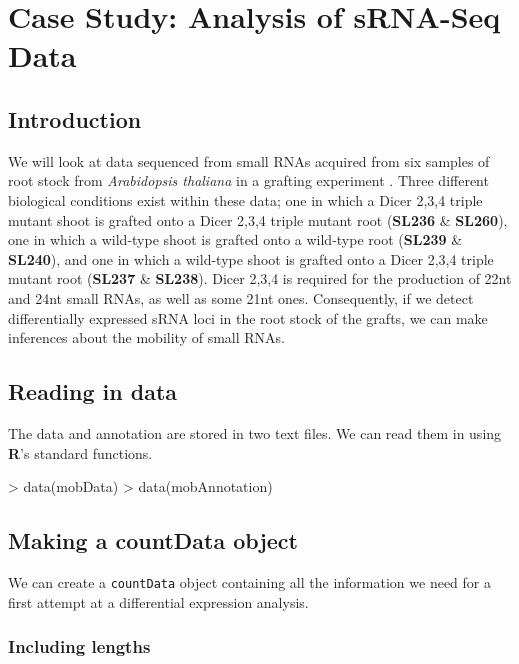\documentclass[a4paper]{article}
\begin{document}
\clearpage

\section{Case Study: Analysis of sRNA-Seq Data}

\subsection{Introduction}

We will look at data sequenced from small RNAs acquired from six samples of root stock from \textsl{Arabidopsis thaliana} in a grafting experiment \cite{molnar}. Three different biological conditions exist within these data; one in which a Dicer 2,3,4 triple mutant shoot is grafted onto a Dicer 2,3,4 triple mutant root (\textbf{SL236} \& \textbf{SL260}), one in which a wild-type shoot is grafted onto a wild-type root (\textbf{SL239} \& \textbf{SL240}), and one in which a wild-type shoot is grafted onto a Dicer 2,3,4 triple mutant root (\textbf{SL237} \& \textbf{SL238}). Dicer 2,3,4 is required for the production of 22nt and 24nt small RNAs, as well as some 21nt ones. Consequently, if we detect differentially expressed  sRNA loci in the root stock of the grafts, we can make inferences about the mobility of small RNAs.

\subsection{Reading in data}

The data and annotation are stored in two text files. We can read them in using \textbf{R}'s standard functions.
\begin{Schunk}
\begin{Sinput}
> data(mobData)
> data(mobAnnotation)
\end{Sinput}
\end{Schunk}

\subsection{Making a countData object}

We can create a \verb'countData' object containing all the information we need for a first attempt at a differential expression analysis.

\subsubsection{Including lengths}
\end{document}

